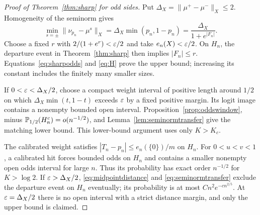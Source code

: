 \begin{proof}[Proof of Theorem~\ref{thm:sharp} for odd sides]
Put $\Delta_X=\|\mu^+-\mu^-\|_X\le2$. Homogeneity of the seminorm gives
\begin{equation}\label{eq:midpointdistance}
 \min_{s=\pm}\|\nu_{p_n}-\mu^s\|_X
 =\Delta_X\min(p_n,1-p_n)
 =\frac{\Delta_X}{1+e^{|F_n|}}.
\end{equation}
Choose a fixed $r$ with $2/(1+e^r)<\varepsilon/2$ and take $e_n(X)<\varepsilon/2$. On $H_n$, the departure event in Theorem~\ref{thm:sharp} then implies $|F_n|\le r$. Equations~\eqref{eq:sharpodds} and \eqref{eq:H} prove the upper bound; increasing its constant includes the finitely many smaller sizes.

If $0<\varepsilon<\Delta_X/2$, choose a compact weight interval of positive length around $1/2$ on which $\Delta_X\min(t,1-t)$ exceeds $\varepsilon$ by a fixed positive margin. Its logit image contains a nonempty bounded open interval. Proposition~\ref{prop:oddswindow}, minus $\mathbb P_{1/2}(H_n^c)=o(n^{-1/2})$, and Lemma~\ref{lem:seminormtransfer} give the matching lower bound. This lower-bound argument uses only $K>K_c$.

The calibrated weight satisfies $|T_n-p_n|\le e_n(\{0\})/m$ on $H_n$. For $0<u<v<1$, a calibrated hit forces bounded odds on $H_n$ and contains a smaller nonempty open odds interval for large $n$. Thus its probability has exact order $n^{-1/2}$ for $K>\log2$. If $\varepsilon>\Delta_X/2$, \eqref{eq:midpointdistance} and \eqref{eq:seminormtransfer} exclude the departure event on $H_n$ eventually; its probability is at most $Cn^2e^{-c n^{2/5}}$. At $\varepsilon=\Delta_X/2$ there is no open interval with a strict distance margin, and only the upper bound is claimed.
\end{proof}


